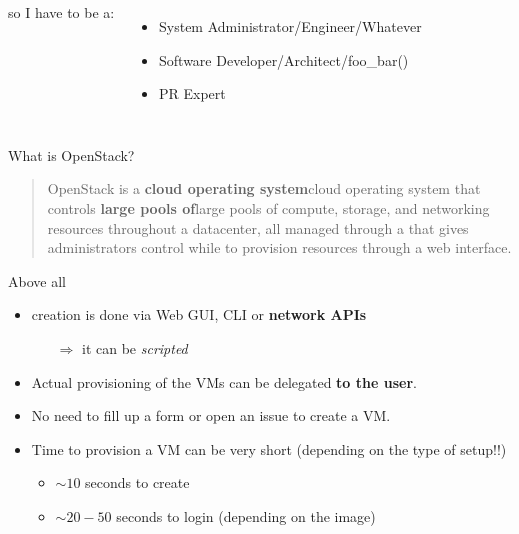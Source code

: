 \documentclass[english,serif,mathserif,usenames,dvipsnames]{beamer}
\begin{document}
\begin{frame}
\begin{columns}
    \pause
    so I have to be a:
    \begin{itemize}
    \item System Administrator/Engineer/Whatever
    \item Software Developer/Architect/foo\_bar()
    \item PR Expert
    \end{itemize}

  \end{columns}
\end{frame}

\begin{frame}
  {What is OpenStack?}
  \begin{quote}
    OpenStack is a 
    \textbf{cloud operating system}{cloud operating system}
    that controls 
    \textbf{large pools of}{large pools of}
    {compute, storage, and networking resources}
    throughout a datacenter, all managed through a
     that
    gives administrators control while  to
    provision resources through a web interface.
  \end{quote}

\end{frame}

\begin{frame}
  {Above all}

  \begin{itemize}
  \item   creation is done via Web GUI, CLI or \textbf{network APIs}

    \begin{itemize}
    \item[$\Rightarrow$] it can be \textit{scripted}
    \end{itemize}

  \item Actual provisioning of the VMs can be delegated \textbf{to the
      user}.

  \item No need to fill up a form or open an issue to create a VM.

  \item Time to provision a VM can be very short (depending on the
    type of setup!!)
    \begin{itemize}
    \item $\sim10$ seconds to create
    \item $\sim20-50$ seconds to login (depending on the image)
    \end{itemize}
  \end{itemize}
\end{frame}
\end{document}

